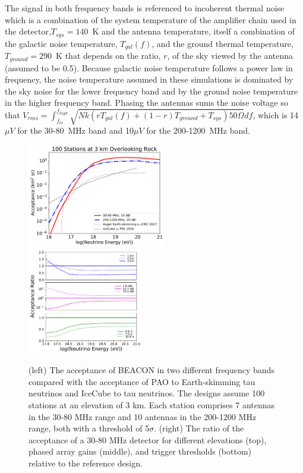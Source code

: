 \documentclass{PoS}
\begin{document}
The signal in both frequency bands is referenced to incoherent thermal noise which is a combination of the system temperature of the amplifier chain used in the detector,$T_{sys} = 140$~K and the antenna temperature, itself a combination of the galactic noise temperature, $T_{gal}(f)$, and the ground thermal temperature, $T_{ground}=290$~K that depends on the ratio, $r$, of the sky viewed by the antenna (assumed to be 0.5). Because galactic noise temperature follows a power law in frequency, the noise temperature assumed in these simulations is dominated by the sky noise for the lower frequency band and by the ground noise temperature in the higher frequency band. Phasing the antennas sums the noise voltage so that $V_{rms} = \int_{f_{lo}}^{f_{high}} \sqrt{N k (r T_{gal}(f)  +(1-r) T_{ground} + T_{sys}) 50 \Omega } df$, which is 14$\mu V$ for the 30-80~MHz band and 10$\mu V$ for the 200-1200~MHz band.

\begin{figure}[hbtp]
\begin{center}
\includegraphics[width=0.54\textwidth]{figures/acceptance_100stations_energyssampling}
\includegraphics[width=0.45\textwidth]{figures/acceptanceratio_100stations_energyssampling_study}
\caption{(left) The acceptance of BEACON in two different frequency bands compared with the acceptance of PAO to Earth-skimming tau neutrinos and IceCube to tau neutrinos. The designs assume 100 stations at an elevation of 3 km. Each station comprises 7 antennas in the 30-80 MHz range and 10 antennas in the 200-1200 MHz range, both with a threshold of 5$\sigma$. (right) The ratio of the acceptance of a 30-80 MHz detector for different elevations (top), phased array gains (middle), and trigger thresholds (bottom) relative to the reference design. }
\label{fig:acceptance}
\end{center}
\end{figure}
\end{document}
